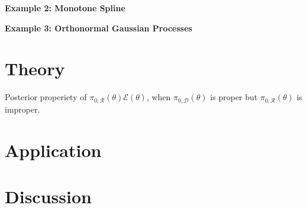 \documentclass[10pt]{article}
\newcommand{\mc}[1]{\mathcal{#1}}
\begin{document}
{\bf Example 2: Monotone Spline} 

{\bf Example 3: Orthonormal Gaussian Processes} 

\section{Theory}

Posterior properiety of $\pi_{0,\mc R}(\theta) \mc E(\theta)$,  when $\pi_{0,\mc D}(\theta)$ is proper but $\pi_{0,\mc R}(\theta)$ is improper. 

\section{Application}
\section{Discussion}





\end{document}
